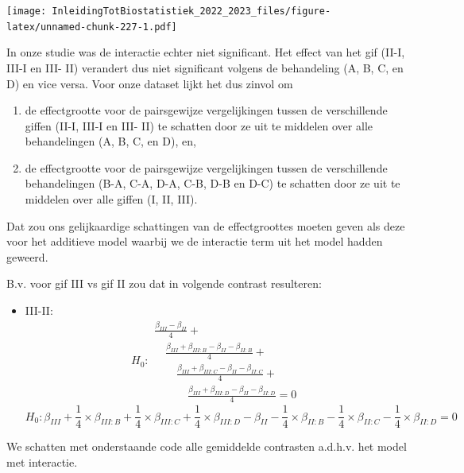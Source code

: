 \documentclass[
  12pt,dutch,coursenotes]{book}
\providecommand{\tightlist}{%
  \setlength{\itemsep}{0pt}\setlength{\parskip}{0pt}}
\begin{document}
\texttt{[image: InleidingTotBiostatistiek\_2022\_2023\_files/figure-latex/unnamed-chunk-227-1.pdf]}

In onze studie was de interactie echter niet significant. Het effect van het gif (II-I, III-I en III- II) verandert dus niet significant volgens de behandeling (A, B, C, en D) en vice versa. Voor onze dataset lijkt het dus zinvol om

\begin{enumerate}
\def\labelenumi{\arabic{enumi}.}
\tightlist
\item
  de effectgrootte voor de pairsgewijze vergelijkingen tussen de verschillende giffen (II-I, III-I en III- II) te schatten door ze uit te middelen over alle behandelingen (A, B, C, en D), en,
\item
  de effectgrootte voor de pairsgewijze vergelijkingen tussen de verschillende behandelingen (B-A, C-A, D-A, C-B, D-B en D-C) te schatten door ze uit te middelen over alle giffen (I, II, III).
\end{enumerate}

Dat zou ons gelijkaardige schattingen van de effectgroottes moeten geven als deze voor het additieve model waarbij we de interactie term uit het model hadden geweerd.

B.v. voor gif III vs gif II zou dat in volgende contrast resulteren:

\begin{itemize}
\tightlist
\item
  III-II:
  \[H_0: 
  \begin{array}{l}
  \frac{\beta_{III}-\beta_{II}}{4} + \\
  \quad \frac{\beta_{III} + \beta_{III:B}-\beta_{II} - \beta_{II:B}}{4} + \\
  \quad \quad \frac{\beta_{III} + \beta_{III:C}-\beta_{II} - \beta_{II:C}}{4} + \\
  \quad \quad \quad \frac{\beta_{III} + \beta_{III:D}-\beta_{II} - \beta_{II:D}}{4}=0
  \end{array}
  \]
  \[
  H_0:\beta_{III} + \frac{1}{4} \times \beta_{III:B} +  \frac{1}{4} \times\beta_{III:C} +  \frac{1}{4} \times\beta_{III:D}
  -\beta_{II} - \frac{1}{4} \times\beta_{II:B} -  \frac{1}{4} \times\beta_{II:C}  - \frac{1}{4} \times\beta_{II:D}=0
  \]
\end{itemize}

We schatten met onderstaande code alle gemiddelde contrasten a.d.h.v. het model met interactie.
\end{document}
